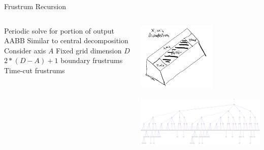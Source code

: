 \begin{frame}{Frustrum Recursion}
  \begin{columns}
  \begin{outline}
  \1 Periodic solve for portion of output AABB
  \1 Similar to central decomposition 
  \1 Consider axis $A$ 
  \1 Fixed grid dimension $D$
  \1 $2 * (D - A) + 1$ boundary frustrums
  \1 Time-cut frustrums
  \end{outline}

  \begin{center}
  \centering
  \includegraphics[width=0.6\textwidth]{frustrum_decomp.png}

  \includegraphics[width=\textwidth]{plan_2d_large.png}
  \end{center}
\end{columns}
\end{frame}

